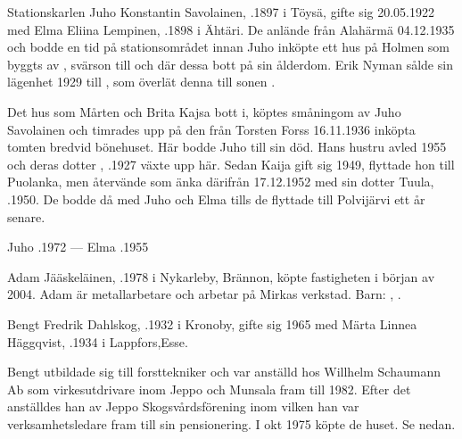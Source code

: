 %
Stationskarlen Juho Konstantin Savolainen, .1897 i Töysä, gifte sig 20.05.1922 med Elma Eliina Lempinen, .1898 i Ähtäri. De anlände från Alahärmä 04.12.1935 och bodde en tid på stationsområdet innan Juho inköpte ett hus på Holmen som byggts av , svärson till  och där dessa bott på sin ålderdom. Erik Nyman sålde sin lägenhet 1929 till , som överlät denna till sonen .

Det hus som Mårten och Brita Kajsa bott i, köptes småningom av Juho Savolainen och timrades upp på den från Torsten Forss 16.11.1936 inköpta tomten bredvid bönehuset. Här bodde Juho till sin död. Hans hustru avled 1955 och deras dotter , .1927 växte upp här. Sedan Kaija gift sig 1949, flyttade hon till Puolanka, men återvände som änka därifrån 17.12.1952 med sin dotter Tuula, .1950. De bodde då med Juho och Elma tills de flyttade till Polvijärvi ett år senare.

Juho .1972  ---  Elma .1955



%


%
Adam Jääskeläinen, .1978 i Nykarleby, Brännon, köpte fastigheten i början av 2004. Adam är metallarbetare och arbetar på Mirkas verkstad.
Barn: , .\jhvspace{}



%
Bengt Fredrik Dahlskog, .1932 i Kronoby, gifte sig 1965 med Märta Linnea Häggqvist, .1934 i Lappfors,Esse.

Bengt utbildade sig till forsttekniker och var anställd hos Willhelm Schaumann Ab som virkesutdrivare inom Jeppo och Munsala fram till 1982. Efter det anställdes han av Jeppo Skogsvårdsförening inom vilken han var verksamhetsledare fram till sin pensionering. I okt 1975 köpte de huset. Se nedan.

